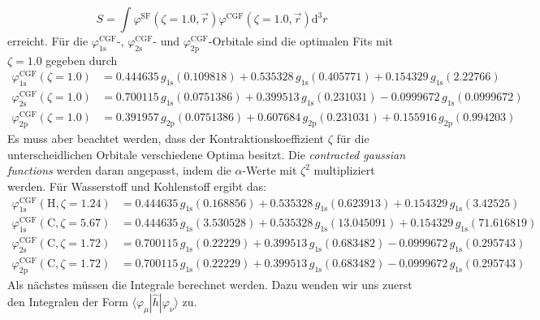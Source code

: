 \documentclass[9pt]{report}
\begin{document}
\begin{equation}
S=\int\varphi^{\mathrm{SF}}(\zeta=1.0,\vec{r})\varphi^{\mathrm{CGF}}(\zeta=1.0,\vec{r})\mathrm{d}^3r
\end{equation}
erreicht. Für die $\varphi_{1\mathrm{s}}^{\mathrm{CGF}}$-, $\varphi_{2\mathrm{s}}^{\mathrm{CGF}}$- und $\varphi_{2\mathrm{p}}^{\mathrm{CGF}}$-Orbitale sind die optimalen Fits mit $\zeta=1.0$ gegeben durch
\begin{align}
\varphi_{1\mathrm{s}}^{\mathrm{CGF}}(\zeta=1.0)&=0.444635\,g_{1\mathrm{s}}(0.109818)+0.535328\,g_{1\mathrm{s}}(0.405771)+0.154329\,g_{1\mathrm{s}}(2.22766)\\
\varphi_{2\mathrm{s}}^{\mathrm{CGF}}(\zeta=1.0)&=0.700115\,g_{1\mathrm{s}}(0.0751386)+0.399513\,g_{1\mathrm{s}}(0.231031)-0.0999672\,g_{1\mathrm{s}}(0.0999672)\\
\varphi_{2\mathrm{p}}^{\mathrm{CGF}}(\zeta=1.0)&=0.391957\,g_{2\mathrm{p}}(0.0751386)+0.607684\,g_{2\mathrm{p}}(0.231031)+0.155916\,g_{2\mathrm{p}}(0.994203)
\end{align}
Es muss aber beachtet werden, dass der Kontraktionskoeffizient $\zeta$ für die unterscheidlichen Orbitale verschiedene Optima besitzt. Die \textit{contracted gaussian functions} werden daran angepasst, indem die $\alpha$-Werte mit $\zeta^2$ multipliziert werden. Für Wasserstoff und Kohlenstoff ergibt das:
\begin{align}
\varphi_{1\mathrm{s}}^{\mathrm{CGF}}(\mathrm{H},\zeta=1.24)&=0.444635\,g_{1\mathrm{s}}(0.168856)+0.535328\,g_{1\mathrm{s}}(0.623913)+0.154329\,g_{1\mathrm{s}}(3.42525)\\
\varphi_{1\mathrm{s}}^{\mathrm{CGF}}(\mathrm{C},\zeta=5.67)&=0.444635\,g_{1\mathrm{s}}(3.530528)+0.535328\,g_{1\mathrm{s}}(13.045091)+0.154329\,g_{1\mathrm{s}}(71.616819)\\
\varphi_{2\mathrm{s}}^{\mathrm{CGF}}(\mathrm{C},\zeta=1.72)&=0.700115\,g_{1\mathrm{s}}(0.22229)+0.399513\,g_{1\mathrm{s}}(0.683482)-0.0999672\,g_{1\mathrm{s}}(0.295743)\\
\varphi_{2\mathrm{p}}^{\mathrm{CGF}}(\mathrm{C},\zeta=1.72)&=0.700115\,g_{1\mathrm{s}}(0.22229)+0.399513\,g_{1\mathrm{s}}(0.683482)-0.0999672\,g_{1\mathrm{s}}(0.295743)
\end{align}
Als nächstes müssen die Integrale berechnet werden. Dazu wenden wir uns zuerst den Integralen der Form $\langle\varphi_{\mu}|\hat{h}|\varphi_{\nu}\rangle$ zu.
\end{document}
